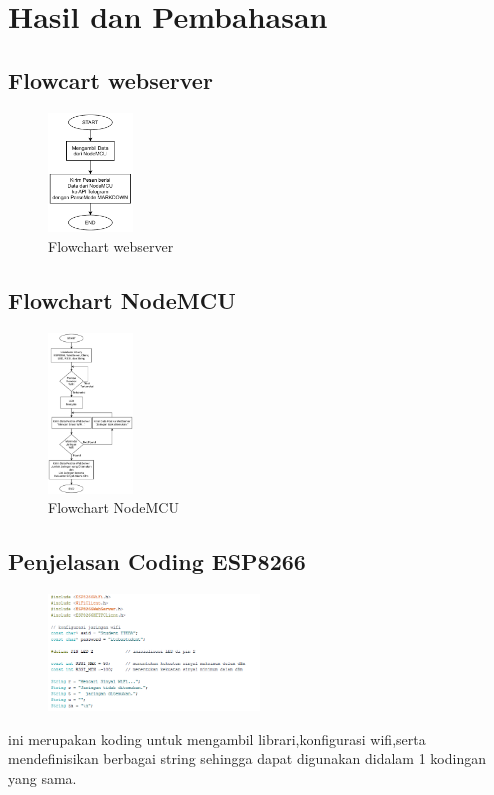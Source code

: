 \documentclass[conference]{IEEEtran}
\begin{document}
    

\section{Hasil dan Pembahasan}
\subsection{Flowcart webserver}
\begin{figure}[h]
    \centering
    \includegraphics[width=0.2\textwidth]{Flowchart WebServer.pdf}
    \caption{Flowchart webserver}
\end{figure}
\vspace{4cm}

\subsection{Flowchart NodeMCU}
\begin{figure}[h]
    \centering
    \includegraphics[width=0.2\textwidth]{Flowchart NodeMCU.pdf}
    \caption{Flowchart NodeMCU}
\end{figure}
\vspace{1cm}
\subsection{Penjelasan Coding ESP8266}

\begin{figure}[h]
    \centering
    \includegraphics[width=0.5\textwidth]{codingesp1.png}
\end{figure}
ini merupakan koding untuk mengambil librari,konfigurasi wifi,serta mendefinisikan berbagai string
sehingga dapat digunakan didalam 1 kodingan yang sama.
\end{document}
